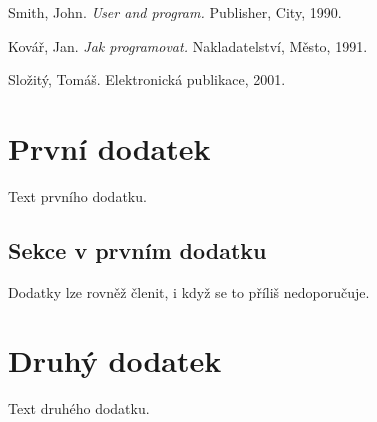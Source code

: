 \documentclass[twoside]{article}
\begin{document}
\cleardoublepage
\begin{thebibliography}{MMM99}

  Smith, John. \emph{User and program.}
  Publisher, City, 1990.

  Kovář, Jan. \emph{Jak programovat.}
  Nakladatelství, Město, 1991.

  Složitý, Tomáš.
  Elektronická publikace, 2001.

\end{thebibliography}


\appendix
\cleardoublepage
\section{První dodatek}
Text prvního dodatku.

\subsection{Sekce v prvním dodatku}
Dodatky lze rovněž členit, i když se to příliš nedoporučuje.

\cleardoublepage
\section{Druhý dodatek}
Text druhého dodatku.


\renewcommand{\indexcolumns}{3}
\printindex
\end{document}
